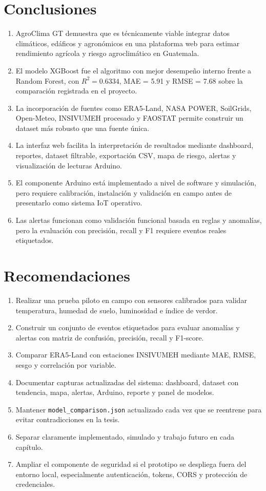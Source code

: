 \documentclass[12pt,letterpaper,oneside]{report}
\newcommand{\codigo}[1]{\texttt{#1}}
\begin{document}
\chapter*{Conclusiones}
\begin{enumerate}
\item AgroClima GT demuestra que es técnicamente viable integrar datos climáticos, edáficos y agronómicos en una plataforma web para estimar rendimiento agrícola y riesgo agroclimático en Guatemala.
\item El modelo XGBoost fue el algoritmo con mejor desempeño interno frente a Random Forest, con $R^2=0.6334$, MAE = 5.91 y RMSE = 7.68 sobre la comparación registrada en el proyecto.
\item La incorporación de fuentes como ERA5-Land, NASA POWER, SoilGrids, Open-Meteo, INSIVUMEH procesado y FAOSTAT permite construir un dataset más robusto que una fuente única.
\item La interfaz web facilita la interpretación de resultados mediante dashboard, reportes, dataset filtrable, exportación CSV, mapa de riesgo, alertas y visualización de lecturas Arduino.
\item El componente Arduino está implementado a nivel de software y simulación, pero requiere calibración, instalación y validación en campo antes de presentarlo como sistema IoT operativo.
\item Las alertas funcionan como validación funcional basada en reglas y anomalías, pero la evaluación con precisión, recall y F1 requiere eventos reales etiquetados.
\end{enumerate}

\chapter*{Recomendaciones}
\begin{enumerate}
\item Realizar una prueba piloto en campo con sensores calibrados para validar temperatura, humedad de suelo, luminosidad e índice de verdor.
\item Construir un conjunto de eventos etiquetados para evaluar anomalías y alertas con matriz de confusión, precisión, recall y F1-score.
\item Comparar ERA5-Land con estaciones INSIVUMEH mediante MAE, RMSE, sesgo y correlación por variable.
\item Documentar capturas actualizadas del sistema: dashboard, dataset con tendencia, mapa, alertas, Arduino, reporte y panel de modelos.
\item Mantener \codigo{model\_comparison.json} actualizado cada vez que se reentrene para evitar contradicciones en la tesis.
\item Separar claramente implementado, simulado y trabajo futuro en cada capítulo.
\item Ampliar el componente de seguridad si el prototipo se despliega fuera del entorno local, especialmente autenticación, tokens, CORS y protección de credenciales.
\end{enumerate}
\end{document}

